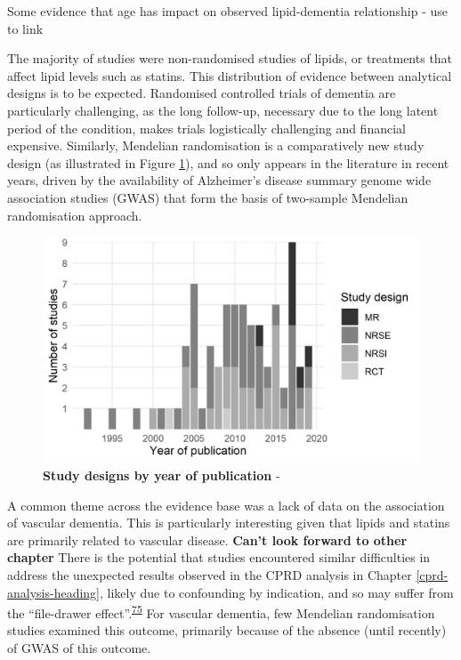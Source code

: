 \documentclass[a4paper, twoside]{templates/ociamthesis}
\begin{document}
Some evidence that age has impact on observed lipid-dementia relationship - use to link

The majority of studies were non-randomised studies of lipids, or treatments that affect lipid levels such as statins. This distribution of evidence between analytical designs is to be expected. Randomised controlled trials of dementia are particularly challenging, as the long follow-up, necessary due to the long latent period of the condition, makes trials logistically challenging and financial expensive. Similarly, Mendelian randomisation is a comparatively new study design (as illustrated in Figure \ref{fig:typeByYear}), and so only appears in the literature in recent years, driven by the availability of Alzheimer's disease summary genome wide association studies (GWAS) that form the basis of two-sample Mendelian randomisation approach.





\begin{figure}[H]
\includegraphics[width=1\linewidth]{figures/sys-rev/type_by_year} \caption[Study designs by year of publication]{\textbf{Study designs by year of publication} -}\label{fig:typeByYear}
\end{figure}

A common theme across the evidence base was a lack of data on the association of vascular dementia. This is particularly interesting given that lipids and statins are primarily related to vascular disease. \textbf{Can't look forward to other chapter} There is the potential that studies encountered similar difficulties in address the unexpected results observed in the CPRD analysis in Chapter \ref{cprd-analysis-heading}, likely due to confounding by indication, and so may suffer from the ``file-drawer effect''.\textsuperscript{\protect\hyperlink{ref-rosenthal1979}{75}} For vascular dementia, few Mendelian randomisation studies examined this outcome, primarily because of the absence (until recently) of GWAS of this outcome.
\end{document}
